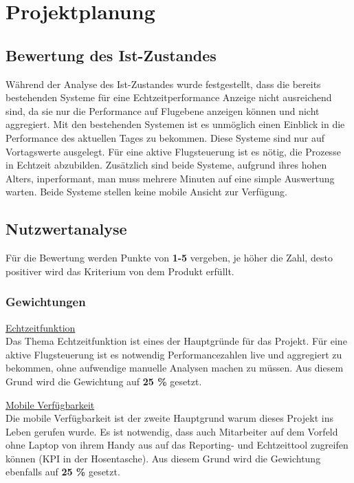 \section{Projektplanung}

	\subsection{Bewertung des Ist-Zustandes}
	Während der Analyse des Ist-Zustandes wurde festgestellt, dass die bereits bestehenden Systeme für eine Echtzeitperformance Anzeige nicht ausreichend sind, da sie nur die Performance auf Flugebene anzeigen können und nicht aggregiert. Mit den bestehenden Systemen ist es unmöglich einen Einblick in die Performance des aktuellen Tages zu bekommen. Diese Systeme sind nur auf Vortagswerte ausgelegt. Für eine aktive Flugsteuerung ist es nötig, die Prozesse in Echtzeit abzubilden. Zusätzlich sind beide Systeme, aufgrund ihres hohen Alters, inperformant, man muss mehrere Minuten auf eine simple Auswertung warten. Beide Systeme stellen keine mobile Ansicht zur Verfügung.


	
	\subsection{Nutzwertanalyse}
	Für die Bewertung werden Punkte von \textbf{1-5} vergeben, je höher die Zahl, desto positiver wird das Kriterium von dem Produkt erfüllt.

		\subsubsection{Gewichtungen}

		{
			\underline{Echtzeitfunktion}\\
			Das Thema Echtzeitfunktion ist eines der Hauptgründe für das Projekt. Für eine aktive Flugsteuerung ist es notwendig Performancezahlen live und aggregiert zu bekommen, ohne aufwendige manuelle Analysen machen zu müssen. Aus diesem Grund wird die Gewichtung auf \textbf{25 \%} gesetzt.
		
		}

		\vspace{8pt}

		{
			\noindent
			\underline{Mobile Verfügbarkeit}\\
			Die mobile Verfügbarkeit ist der zweite Hauptgrund warum dieses Projekt ins Leben gerufen wurde. Es ist notwendig, dass auch Mitarbeiter auf dem Vorfeld ohne Laptop von ihrem Handy aus auf das Reporting- und Echtzeittool zugreifen können (KPI in der Hosentasche). Aus diesem Grund wird die Gewichtung ebenfalls auf \textbf{25 \%} gesetzt.
		}

